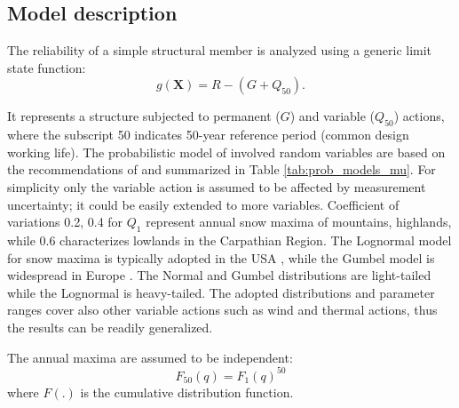 \subsection{Model description}
The reliability of a simple structural member is analyzed using a generic limit state function:
\begin{equation}
	 g(\mathbf{X}) = R - \left( {G + {Q_{50}}} \right).
\end{equation}

It represents a structure subjected to permanent ($G$) and variable ($Q_{50}$) actions, where the subscript 50 indicates 50-year reference period (common design working life). The probabilistic model of involved random variables are based on the recommendations of \citep{JCSS_basis} and summarized in Table \ref{tab:prob_models_mu}. For simplicity only the variable action is assumed to be affected by measurement uncertainty; it could be easily extended to more variables. Coefficient of variations 0.2, 0.4 for $Q_1$ represent annual snow maxima of mountains, highlands, while 0.6 characterizes lowlands in the Carpathian Region. The Lognormal model for snow maxima is typically adopted in the USA \citep{ASCE2010}, while the Gumbel model is widespread in Europe \citep{Sanpaolesi1998, JCSS_load}. The Normal and Gumbel distributions are light-tailed while the Lognormal is heavy-tailed. The adopted distributions and parameter ranges cover also other variable actions such as wind and thermal actions, thus the results can be readily generalized.

The annual maxima are assumed to be independent:
\begin{equation}
\label{eq:gfun_mu}
	{F_{50}}\left( q \right) = {F_1}{\left( q \right)^{50}}
\end{equation}
where $F(.)$ is the cumulative distribution function.

